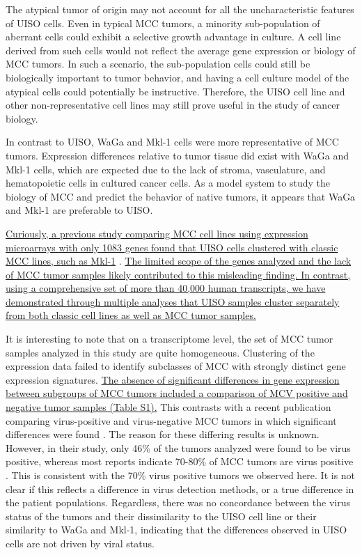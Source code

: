 \documentclass[10pt]{article}
\begin{document}
The atypical tumor of origin may not account for all the uncharacteristic features of UISO cells.
Even in typical MCC tumors, a minority sub-population of aberrant cells could exhibit a selective growth advantage in culture.
A cell line derived from such cells would not reflect the average gene expression or biology of MCC tumors.
In such a scenario, the sub-population cells could still be biologically important to tumor behavior, and having a cell culture model of the atypical cells could potentially be instructive.
Therefore, the UISO cell line and other non-representative cell lines may still prove useful in the study of cancer biology.

In contrast to UISO, WaGa and Mkl-1 cells were more representative of MCC tumors.
Expression differences relative to tumor tissue did exist with WaGa and Mkl-1 cells, which are expected due to the lack of stroma, vasculature, and hematopoietic cells in cultured cancer cells.
As a model system to study the biology of MCC and predict the behavior of native tumors, it appears that WaGa and Mkl-1 are preferable to UISO.

\uline{Curiously, a previous study comparing MCC cell lines using expression microarrays with only 1083 genes found that UISO cells clustered with classic MCC lines, such as Mkl-1} \citep{VanGele2004Geneexpression}.
\uline{The limited scope of the genes analyzed and the lack of MCC tumor samples likely contributed to this misleading finding.
In contrast, using a comprehensive set of more than 40,000 human transcripts, we have demonstrated through multiple analyses that UISO samples cluster separately from both classic cell lines as well as MCC tumor samples.}

It is interesting to note that on a transcriptome level, the set of MCC tumor samples analyzed in this study are quite homogeneous.
Clustering of the expression data failed to identify subclasses of MCC with strongly distinct gene expression signatures.
\uline{The absence of significant differences in gene expression between subgroups of MCC tumors included a comparison of MCV positive and negative tumor samples (Table S1).}
This contrasts with a recent publication comparing virus-positive and virus-negative MCC tumors in which significant differences were found \citep{Harms2013Distinct}.
The reason for these differing results is unknown.
However, in their study, only 46\% of the tumors analyzed were found to be virus positive, whereas most reports indicate 70-80\% of MCC tumors are virus positive \citep{Pulitzer2009Merkel,Feng2008Clonal}.
This is consistent with the 70\% virus positive tumors we observed here.
It is not clear if this reflects a difference in virus detection methods, or a true difference in the patient populations.
Regardless, there was no concordance between the virus status of the tumors and their dissimilarity to the UISO cell line or their similarity to WaGa and Mkl-1, indicating that the differences observed in UISO cells are not driven by viral status.
\end{document}
